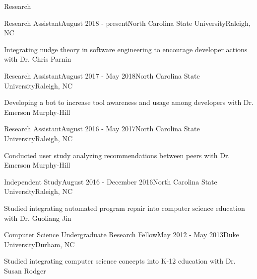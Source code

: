 \documentclass{resume} %
\begin{document}

\begin{rSection}{Research}


\begin{rSubsection}{Research Assistant}{August 2018 - present}{North Carolina State University}{Raleigh, NC}
\item Integrating nudge theory in software engineering to encourage developer actions with Dr. Chris Parnin
\end{rSubsection}


\begin{rSubsection}{Research Assistant}{August 2017 - May 2018}{North Carolina State University}{Raleigh, NC}
\item Developing a bot to increase tool awareness and usage among developers with Dr. Emerson Murphy-Hill
\end{rSubsection}


\begin{rSubsection}{Research Assistant}{August 2016 - May 2017}{North Carolina State University}{Raleigh, NC}
\item Conducted user study analyzing recommendations between peers with Dr. Emerson Murphy-Hill
\end{rSubsection}


\begin{rSubsection}{Independent Study}{August 2016 - December 2016}{North Carolina State University}{Raleigh, NC}
\item Studied integrating automated program repair into computer science education with Dr. Guoliang Jin
\end{rSubsection}


\begin{rSubsection}{Computer Science Undergraduate Research Fellow}{May 2012 - May 2013}{Duke University}{Durham, NC}
\item Studied integrating computer science concepts into K-12 education with Dr. Susan Rodger
\end{rSubsection}


\end{rSection}
\end{document}
